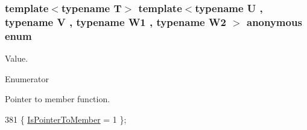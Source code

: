 \subsubsection[{\texorpdfstring{anonymous enum}{anonymous enum}}]{\setlength{\rightskip}{0pt plus 5cm}template$<$typename T$>$ template$<$typename U , typename V , typename W1 , typename W2 $>$ anonymous enum}\hypertarget{structTypeTraits_1_1PtrToMemberTraits_3_01U_07V_1_1_5_08_07W1_00_01W2_08_01const_01_01_4_aa144a385d3341d4473a316d4881e604e}{}\label{structTypeTraits_1_1PtrToMemberTraits_3_01U_07V_1_1_5_08_07W1_00_01W2_08_01const_01_01_4_aa144a385d3341d4473a316d4881e604e}
Value. \begin{Desc}
\item[Enumerator]\par
\begin{description}
\item[{\em 
Is\+Pointer\+To\+Member\hypertarget{structTypeTraits_1_1PtrToMemberTraits_3_01U_07V_1_1_5_08_07W1_00_01W2_08_01const_01_01_4_aa144a385d3341d4473a316d4881e604ea95af5c496d61cc3101437d6ab0c620ef}{}\label{structTypeTraits_1_1PtrToMemberTraits_3_01U_07V_1_1_5_08_07W1_00_01W2_08_01const_01_01_4_aa144a385d3341d4473a316d4881e604ea95af5c496d61cc3101437d6ab0c620ef}
}]Pointer to member function. \end{description}
\end{Desc}

\begin{DoxyCode}
381 \{ \hyperlink{structTypeTraits_1_1PtrToMemberTraits_3_01U_07V_1_1_5_08_07W1_00_01W2_08_01const_01_01_4_aa144a385d3341d4473a316d4881e604ea95af5c496d61cc3101437d6ab0c620ef}{IsPointerToMember} = 1    \};
\end{DoxyCode}
